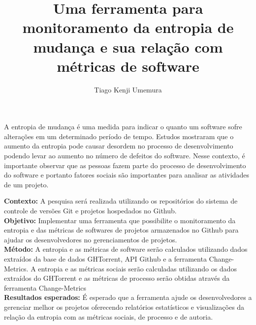 \documentclass[12pt,english,brazil,a4paper,utf8,oneside]{utfpr-tcc}
\author{Tiago Kenji Umemura}  %
\title{Uma ferramenta para monitoramento da entropia de mudança e sua relação com métricas de software} %
\begin{document}
	
\frontmatter
\maketitle

\begin{resumo}

A entropia de mudança é uma medida para indicar o quanto um software sofre alterações em um determinado período de tempo. Estudos mostraram que o aumento da entropia pode causar desordem no processo de desenvolvimento podendo levar ao aumento no número de defeitos do software. Nesse contexto, é importante observar que as pessoas fazem parte do processo de desenvolvimento do software e portanto fatores sociais são importantes para analisar as atividades de um projeto.

\textbf{Contexto:} A pesquisa será realizada utilizando os repositórios do sistema de controle de versões Git e projetos hospedados no Github.\\
\textbf{Objetivo:} Implementar uma ferramenta que possibilite o monitoramento da entropia e das métricas de softwares de projetos armazenados no Github para ajudar os desenvolvedores no gerenciamentos de projetos. \\
\textbf{Método:} A entropia e as métricas de software serão calculados utilizando dados extraídos da base de dados GHTorrent, API Github e a ferramenta Change-Metrics. A entropia e as métricas sociais serão calculadas utilizando os dados extraídos do GHTorrent e as métricas de processo serão obtidas através da ferramenta Change-Metrics\\
\textbf{Resultados esperados:} É esperado que a ferramenta ajude os desenvolvedores a gerenciar melhor os projetos oferecendo relatórios estatísticos e visualizações da relação da entropia com as métricas sociais, de processo e de autoria.

\end{resumo}

\end{document}

